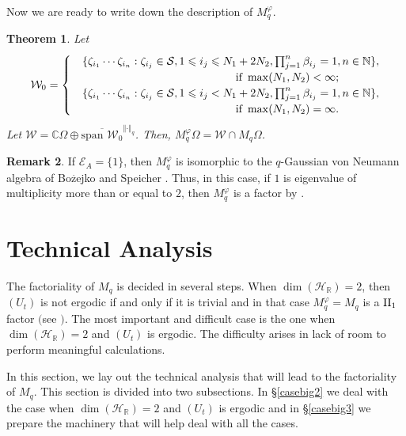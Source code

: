 \documentclass[12pt, a4paper,reqno]{amsart}
\newtheorem{Theorem}{Theorem}[section]
\theoremstyle{definition}
\newtheorem{Remark}[Theorem]{Remark}
\renewcommand{\leq}{\leqslant}
\def\C{\mathbb C}
\def\N{\mathbb N}
\def\R{\mathbb R}
\newcommand{\CH}{\mathcal{H}}
\newcommand{\CS}{\mathcal{S}}
\newcommand{\CW}{\mathcal{W}}
\newcommand{\norm}[1]{\left\Vert#1\right\Vert}
\begin{document}
Now we are ready to write down the description of $M_q^\varphi$. 

\begin{Theorem}\cite[Thm. 3.4]{bik-kunal}\label{CentraliserDescribe}
Let 
\begin{align*}
\CW_0 =\begin{cases}& \{\zeta_{i_1}\cdots \zeta_{i_n}:\zeta_{i_j} \in \CS, 1\leq i_j\leq  N_1+2N_2, \prod_{j=1}^n\beta_{i_j}= 1, n\in \N \},\\
&\indent\indent\indent\indent\indent\indent\indent\indent\indent \text{ if }\max(N_1,N_2)<\infty;\\
&\{\zeta_{i_1}\cdots\zeta_{i_n}:\zeta_{i_j} \in \CS, 1\leq i_j <N_1+2N_2, \prod_{j=1}^n\beta_{i_j}= 1, n\in \N \},\\
&\indent\indent\indent\indent\indent\indent\indent\indent\indent \text{ if }\max(N_1,N_2)=\infty.\\
\end{cases}
\end{align*} 
Let $\CW=\C\Omega\oplus \overline{\text{span }\CW_0}^{\norm{\cdot}_q}$. Then, $M_q^\varphi\Omega=\CW\cap M_q\Omega$.
\end{Theorem}




\begin{Remark}\label{CentralizerRemark}
If $\mathcal{E}_A=\{1\}$, then $M_q^{\varphi}$ is isomorphic to the $q$-Gaussian von Neumann algebra of Bo$\overset{.}{\text{z}}$ejko and Speicher \cite{BS,BKS}. Thus, in this case, if $1$ is eigenvalue of multiplicity more than or equal to $2$, then $M_q^{\varphi}$ is a factor by \cite{ER}.
\end{Remark}



\section{Technical Analysis}\label{mainsec}

The factoriality of $M_q$ is decided in several steps. When $\dim(\CH_\R)=2$, then $(U_t)$ is not ergodic if and only if it is trivial and in that case $M_q^\varphi=M_q$ is a $\rm{II}_1$ factor $($see \cite{bik-kunal,ER}$)$. The most important and difficult case is the one when $\dim(\CH_\R)=2$ and $(U_t)$ is ergodic. The difficulty arises in lack of room to perform meaningful calculations. 

In this section, we lay out the technical analysis that will lead to the factoriality of $M_q$. This section is divided into two subsections. In \S\ref{casebig2} we deal with the case when $\dim(\CH_\R)=2$ and $(U_t)$ is ergodic and in \S\ref{casebig3} we prepare the machinery that will help deal with all the cases. 
\end{document}
